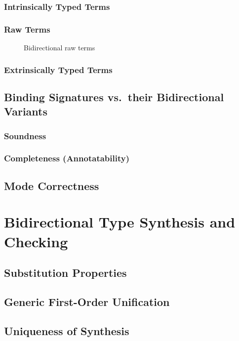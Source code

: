 \documentclass[acmsmall]{acmart}
\begin{document}
\subsubsection{Intrinsically Typed Terms}

\subsubsection{Raw Terms}

\begin{figure}
  \caption{Bidirectional raw terms}
\end{figure}
\subsubsection{Extrinsically Typed Terms}

\begin{example}
  
\end{example}


\subsection{Binding Signatures vs.\ their Bidirectional Variants}
\subsubsection{Soundness}
\subsubsection{Completeness (Annotatability)}
\subsection{Mode Correctness}

\section{Bidirectional Type Synthesis and Checking}
\subsection{Substitution Properties}
\subsection{Generic First-Order Unification}
\cite{McBride2003,McBride2003a}
\subsection{Uniqueness of Synthesis}
\end{document}
